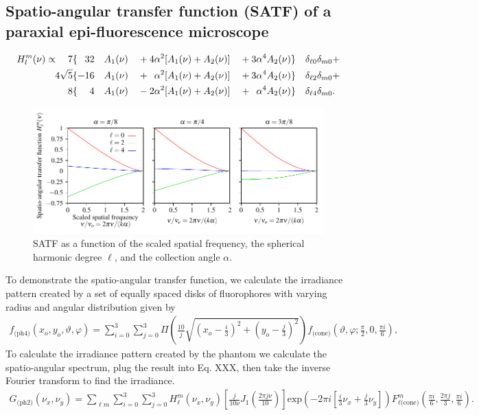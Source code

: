 \documentclass[]{osa-article}
\begin{document}
\subsection{Spatio-angular transfer function (SATF)  of a paraxial epi-fluorescence microscope}
  \begin{alignat}{6}
  H_l^m(\nu) \propto \quad 7&\{\hphantom{-}32&&A_1(\nu)&& + 4\alpha^2[A_1(\nu) + A_2(\nu)]&&+ 3\alpha^4A_2(\nu)\}&&\delta_{\ell 0}\delta_{m0}+\nonumber\\
  4\sqrt{5}&\{-16&&A_1(\nu)&& + \hphantom{1}\alpha^2[A_1(\nu) + A_2(\nu)] &&+ 3\alpha^4A_2(\nu)\}&&\delta_{\ell 2}\delta_{m0} + \nonumber\\
  8&\{\hphantom{-1}4&&A_1(\nu)&& - 2\alpha^2[A_1(\nu) + A_2(\nu)] &&+ \hphantom{1}\alpha^4A_2(\nu)\}&&\delta_{\ell 4}\delta_{m0}.
\end{alignat}

\begin{figure}[h]
 \centering
   \centering
   \includegraphics[scale=0.8]{../figures/satf/satf.pdf}
   \caption{SATF as a function of the scaled spatial frequency, the spherical
     harmonic degree $\ell$, and the collection angle $\alpha$. }
   \label{fig:atf}
 \end{figure}

 To demonstrate the spatio-angular transfer function, we calculate the
 irradiance pattern created by a set of equally spaced disks of fluorophores
 with varying radius and angular distribution given by
 \begin{align}
   f_{\text{(ph4)}}(x_o, y_o, \vartheta, \varphi) = \sum_{i=0}^3 \sum_{j=0}^3 \Pi\left(\frac{10}{j}\sqrt{\left(x_o - \frac{i}{3}\right)^2 + \left(y_o - \frac{j}{3}\right)^2}\right)f_{\text{(cone)}}\left(\vartheta, \varphi; \frac{\pi}{2}, 0, \frac{\pi i}{6}\right),\label{eq:phantom4}
 \end{align}
 To calculate the irradiance pattern created by the phantom we calculate the
 spatio-angular spectrum, plug the result into Eq. XXX, then take the inverse
 Fourier transform to find the irradiance.
  \begin{align}
    G_{\text{(ph2)}}(\nu_x, \nu_y) = \sum_{\ell m}\sum_{i=0}^3 \sum_{j=0}^3 H_\ell^m(\nu_x, \nu_y)\left[\frac{j}{10\nu}J_1\left(\frac{2\pi j\nu}{10}\right)\right]\text{exp}\left(-2\pi i\left[\frac{i}{3}\nu_x + \frac{j}{3}\nu_y\right]\right)F_{\ell\text{(cone)}}^m\left(\frac{\pi i}{6}, \frac{2\pi j}{3}, \frac{\pi i}{6}\right).\label{eq:phantom4g}
 \end{align}
\end{document}

